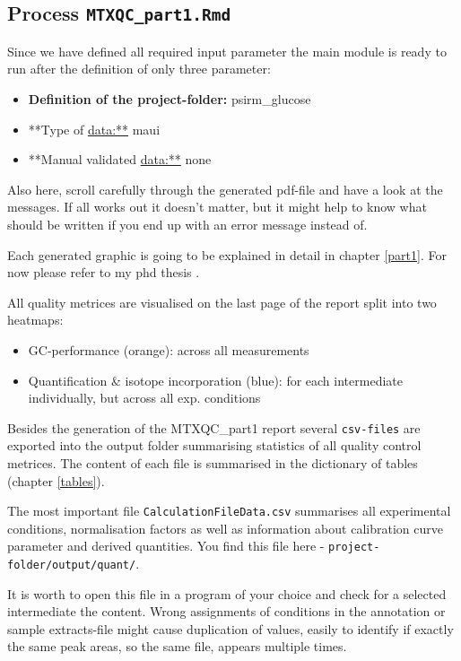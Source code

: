 \documentclass[]{book}
\providecommand{\tightlist}{%
  \setlength{\itemsep}{0pt}\setlength{\parskip}{0pt}}
\theoremstyle{definition}
\theoremstyle{definition}
\theoremstyle{definition}
\theoremstyle{remark}
\begin{document}
\subsection{\texorpdfstring{Process
\texttt{MTXQC\_part1.Rmd}}{Process MTXQC\_part1.Rmd}}\label{process-mtxqc_part1.rmd}

Since we have defined all required input parameter the main module is
ready to run after the definition of only three parameter:

\begin{itemize}
\tightlist
\item
  \textbf{Definition of the project-folder:} psirm\_glucose
\item
  **Type of \url{data:**} maui
\item
  **Manual validated \url{data:**} none
\end{itemize}

Also here, scroll carefully through the generated pdf-file and have a
look at the messages. If all works out it doesn't matter, but it might
help to know what should be written if you end up with an error message
instead of.

Each generated graphic is going to be explained in detail in chapter
\ref{part1}. For now please refer to my phd thesis \citep{Zasada2017}.

All quality metrices are visualised on the last page of the report split
into two heatmaps:

\begin{itemize}
\tightlist
\item
  GC-performance (orange): across all measurements
\item
  Quantification \& isotope incorporation (blue): for each intermediate
  individually, but across all exp. conditions
\end{itemize}

Besides the generation of the MTXQC\_part1 report several
\texttt{csv-files} are exported into the output folder summarising
statistics of all quality control metrices. The content of each file is
summarised in the dictionary of tables (chapter \ref{tables}).

The most important file \texttt{CalculationFileData.csv} summarises all
experimental conditions, normalisation factors as well as information
about calibration curve parameter and derived quantities. You find this
file here - \texttt{project-folder/output/quant/}.

It is worth to open this file in a program of your choice and check for
a selected intermediate the content. Wrong assignments of conditions in
the annotation or sample extracts-file might cause duplication of
values, easily to identify if exactly the same peak areas, so the same
file, appears multiple times.
\end{document}
